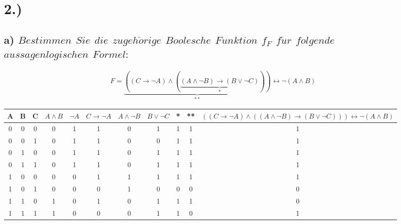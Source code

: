 \documentclass[titlepage]{article}
\newcommand{\1}{\mathbb{1}}
\newcommand{\0}{\mathbb{0}}
\begin{document}
	\newpage
	\section*{2.)}
		\subsection*{a) \textit{$Bestimmen$ $Sie$ $die$ $zugeh\ddot orige$ $Boolesche$ $Funktion$ $f_F$ $f\ddot ur$ $folgende$ $aussagenlogischen$ $Formel:$}}
		\begin{align*}
			F=\underbrace{((C\rightarrow\neg A)\wedge(\underbrace{(A\wedge\neg B)\rightarrow(B\vee\neg C)}_*))}_{**}\leftrightarrow\lnot(A\wedge B)
		\end{align*}
			\begin{table}[h]
				\begin{tabular}{ccc||cccccccc}
					A&B&C&$A\wedge B$&$\neg A$&$C\rightarrow\neg A$&$A\wedge\neg B$&$B\vee\neg C$&*&**&$((C\rightarrow\neg A)\wedge((A\wedge\neg B)\rightarrow(B\vee\neg C)))\leftrightarrow\lnot(A\wedge B)$\\\hline
					0&0&0&0&1&1&0&1&1&1&1\\
					0&0&1&0&1&1&0&0&1&1&1\\
					0&1&0&0&1&1&0&1&1&1&1\\
					0&1&1&0&1&1&0&1&1&1&1\\
					1&0&0&0&0&1&1&1&1&1&1\\
					1&0&1&0&0&0&1&0&0&0&0\\
					1&1&0&1&0&1&0&1&1&1&0\\
					1&1&1&1&0&0&0&1&1&0&1
				\end{tabular}
			\end{table}
		
\end{document}
